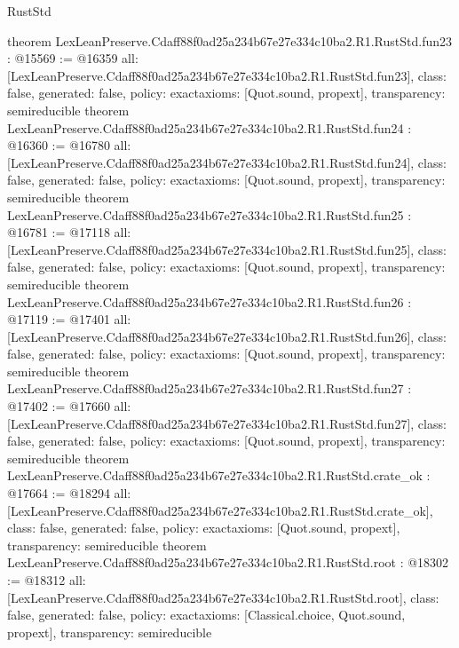 \begin{lexlean}{RustStd}
\begin{coremodule}
{}
theorem LexLeanPreserve.Cdaff88f0ad25a234b67e27e334c10ba2.R1.RustStd.fun23 : @15569 := @16359 {
  all: [LexLeanPreserve.Cdaff88f0ad25a234b67e27e334c10ba2.R1.RustStd.fun23],
  class: false,
  generated: false,
  policy: exact{axioms: [Quot.sound, propext]},
  transparency: semireducible
}
theorem LexLeanPreserve.Cdaff88f0ad25a234b67e27e334c10ba2.R1.RustStd.fun24 : @16360 := @16780 {
  all: [LexLeanPreserve.Cdaff88f0ad25a234b67e27e334c10ba2.R1.RustStd.fun24],
  class: false,
  generated: false,
  policy: exact{axioms: [Quot.sound, propext]},
  transparency: semireducible
}
theorem LexLeanPreserve.Cdaff88f0ad25a234b67e27e334c10ba2.R1.RustStd.fun25 : @16781 := @17118 {
  all: [LexLeanPreserve.Cdaff88f0ad25a234b67e27e334c10ba2.R1.RustStd.fun25],
  class: false,
  generated: false,
  policy: exact{axioms: [Quot.sound, propext]},
  transparency: semireducible
}
theorem LexLeanPreserve.Cdaff88f0ad25a234b67e27e334c10ba2.R1.RustStd.fun26 : @17119 := @17401 {
  all: [LexLeanPreserve.Cdaff88f0ad25a234b67e27e334c10ba2.R1.RustStd.fun26],
  class: false,
  generated: false,
  policy: exact{axioms: [Quot.sound, propext]},
  transparency: semireducible
}
theorem LexLeanPreserve.Cdaff88f0ad25a234b67e27e334c10ba2.R1.RustStd.fun27 : @17402 := @17660 {
  all: [LexLeanPreserve.Cdaff88f0ad25a234b67e27e334c10ba2.R1.RustStd.fun27],
  class: false,
  generated: false,
  policy: exact{axioms: [Quot.sound, propext]},
  transparency: semireducible
}
theorem LexLeanPreserve.Cdaff88f0ad25a234b67e27e334c10ba2.R1.RustStd.crate_ok : @17664 := @18294 {
  all: [LexLeanPreserve.Cdaff88f0ad25a234b67e27e334c10ba2.R1.RustStd.crate_ok],
  class: false,
  generated: false,
  policy: exact{axioms: [Quot.sound, propext]},
  transparency: semireducible
}
theorem LexLeanPreserve.Cdaff88f0ad25a234b67e27e334c10ba2.R1.RustStd.root : @18302 := @18312 {
  all: [LexLeanPreserve.Cdaff88f0ad25a234b67e27e334c10ba2.R1.RustStd.root],
  class: false,
  generated: false,
  policy: exact{axioms: [Classical.choice, Quot.sound, propext]},
  transparency: semireducible
}


\end{coremodule}
\end{lexlean}
